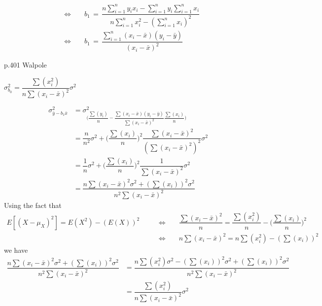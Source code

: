 \begin{align*}
    &\Longleftrightarrow \hspace{20pt} b_{1} \hspace{2pt} = \hspace{2pt} \dfrac{n\sum_{i = 1}^{n} y_{i}x_{i} - \sum_{i = 1}^{n} y_{i} \sum_{i = 1}^{n} x_{i}}{n\sum_{i = 1}^{n} x_{i}^{2} - (\sum_{i = 1}^{n} x_{i})^{2}} \\[1ex]
    &\Longleftrightarrow \hspace{20pt} b_{1} \hspace{2pt} = \hspace{2pt} \dfrac{\sum_{i = 1}^{n} (x_{i} - \bar{x})(y_{i} - \bar{y})}{(x_{i} - \bar{x})^{2}}
\end{align*}

\newpage
p.401 Walpole\\[2ex]
\begin{center}
    $\sigma_{b_{0}}^{2} = \dfrac{\sum(x_{i}^{2})}{n\sum(x_{i} - \bar{x})^{2}}\sigma^{2}$
\end{center}
\begin{align*}
    \sigma_{\bar{y} - b_{1}\bar{x}}^{2} &= \sigma_{\Big(\dfrac{\sum(y_{i})}{n} - \dfrac{\sum(x_{i} - \bar{x})(y_{i} - \bar{y})}{\sum(x_{i} - \bar{x})^{2}}\dfrac{\sum(x_{i})}{n}\Big)}^{2}\\[1ex]
    &= \dfrac{n}{n^{2}}\sigma^{2} + \Big(\dfrac{\sum(x_{i})}{n}\Big)^{2}\dfrac{\sum(x_{i} - \bar{x})^{2}}{(\sum(x_{i} - \bar{x})^{2})^{2}}\sigma^{2}\\[1ex]
    &= \dfrac{1}{n}\sigma^{2} + \Big(\dfrac{\sum(x_{i})}{n}\Big)^{2}\dfrac{1}{\sum(x_{i} - \bar{x})^{2}}\sigma^{2}\\[1ex]
    &= \dfrac{n\sum(x_{i} - \bar{x})^{2}\sigma^{2} + (\sum(x_{i}))^{2}\sigma^{2}}{n^{2}\sum(x_{i} - \bar{x})^{2}}
\end{align*}
Using the fact that
\begin{align*}
    E[(X - \mu_{X})^{2}] = E(X^{2}) - (E(X))^{2} \hspace{20pt} &\Longleftrightarrow \hspace{20pt} \dfrac{\sum(x_{i} - \bar{x})^{2}}{n} = \dfrac{\sum(x_{i}^{2})}{n} - \Big(\dfrac{\sum(x_{i})}{n}\Big)^{2}\\[1ex]
    &\Longleftrightarrow \hspace{20pt} n\sum(x_{i} - \bar{x})^{2} = n\sum(x_{i}^{2}) - (\sum(x_{i}))^{2}
\end{align*}
we have
\begin{align*}
    \dfrac{n\sum(x_{i} - \bar{x})^{2}\sigma^{2} + (\sum(x_{i}))^{2}\sigma^{2}}{n^{2}\sum(x_{i} - \bar{x})^{2}} &= \dfrac{n\sum(x_{i}^{2})\sigma^{2} - (\sum(x_{i}))^{2}\sigma^{2} + (\sum(x_{i}))^{2}\sigma^{2}}{n^{2}\sum(x_{i} - \bar{x})^{2}}\\[1ex]
    &= \dfrac{\sum(x_{i}^{2})}{n\sum(x_{i} - \bar{x})^{2}}\sigma^{2}
\end{align*}



